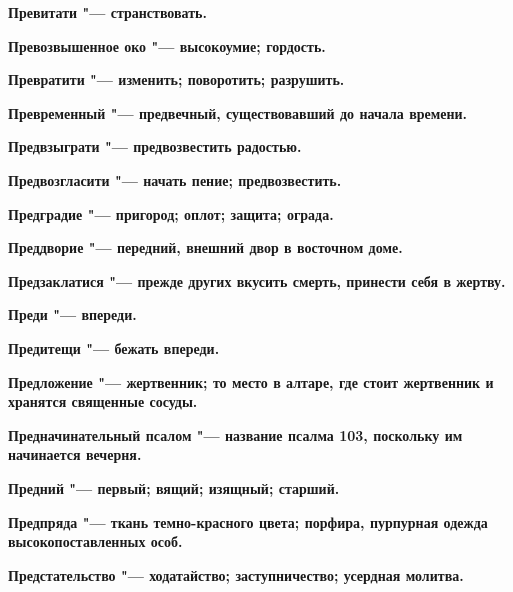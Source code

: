 \bfseries Превитати \normalfont{} "--- странствовать. 




\bfseries Превозвышенное око \normalfont{} "--- высокоумие; гордость. 




\bfseries Превратити \normalfont{} "--- изменить; поворотить; разрушить. 




\bfseries Превременный \normalfont{} "--- предвечный, существовавший до начала времени. 




\bfseries Предвзыграти \normalfont{} "--- предвозвестить радостью. 




\bfseries Предвозгласити \normalfont{} "--- начать пение; предвозвестить. 




\bfseries Предградие \normalfont{} "--- пригород; оплот; защита; ограда. 




\bfseries Преддворие \normalfont{} "--- передний, внешний двор в восточном доме. 




\bfseries Предзаклатися \normalfont{} "--- прежде других вкусить смерть, принести себя в жертву. 




\bfseries Преди \normalfont{} "--- впереди. 




\bfseries Предитещи \normalfont{} "--- бежать впереди. 




\bfseries Предложение \normalfont{} "--- жертвенник; то место в алтаре, где стоит жертвенник и хранятся священные сосуды. 




\bfseries Предначинательный псалом \normalfont{} "--- название псалма 103, поскольку им начинается вечерня. 




\bfseries Предний \normalfont{} "--- первый; вящий; изящный; старший. 




\bfseries Предпряда \normalfont{} "--- ткань темно-красного цвета; порфира, пурпурная одежда высокопоставленных особ. 




\bfseries Предстательство \normalfont{} "--- ходатайство; заступничество; усердная молитва. 




